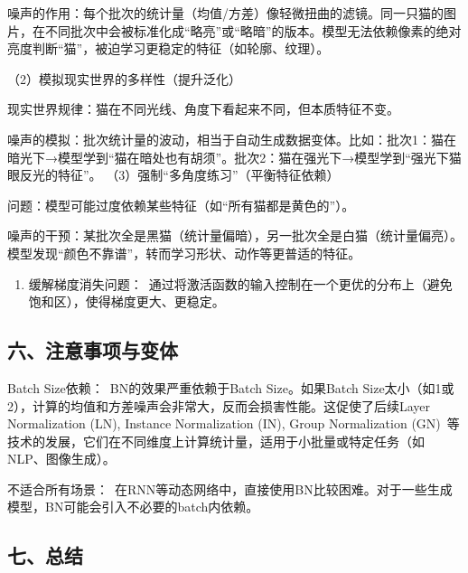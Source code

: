 噪声的作用：每个批次的统计量（均值/方差）像轻微扭曲的滤镜。同一只猫的图片，在不同批次中会被标准化成``略亮''或``略暗''的版本。模型无法依赖像素的绝对亮度判断``猫''，被迫学习更稳定的特征（如轮廓、纹理）。

（2）模拟现实世界的多样性（提升泛化）\hspace{0pt}\hspace{0pt}

现实世界规律：猫在不同光线、角度下看起来不同，但本质特征不变。

噪声的模拟：批次统计量的波动，相当于自动生成数据变体。比如：批次1：猫在暗光下→模型学到``猫在暗处也有胡须''。批次2：猫在强光下→模型学到``强光下猫眼反光的特征''。
（3）强制``多角度练习''（平衡特征依赖）\hspace{0pt}\hspace{0pt}

问题：模型可能过度依赖某些特征（如``所有猫都是黄色的''）。

噪声的干预：某批次全是黑猫（统计量偏暗），另一批次全是白猫（统计量偏亮）。模型发现``颜色不靠谱''，转而学习形状、动作等更普适的特征。

\begin{enumerate}
\def\labelenumi{\arabic{enumi}.}
\setcounter{enumi}{3}
\tightlist
\item
  缓解梯度消失问题：~通过将激活函数的输入控制在一个更优的分布上（避免饱和区），使得梯度更大、更稳定。
\end{enumerate}

\hypertarget{ux516dux6ce8ux610fux4e8bux9879ux4e0eux53d8ux4f53}{%
\subsection{六、注意事项与变体}\label{ux516dux6ce8ux610fux4e8bux9879ux4e0eux53d8ux4f53}}

Batch Size依赖：~BN的效果严重依赖于Batch Size。如果Batch Size太小（如1或2），计算的均值和方差噪声会非常大，反而会损害性能。这促使了后续Layer Normalization (LN), Instance Normalization (IN), Group Normalization (GN)~等技术的发展，它们在不同维度上计算统计量，适用于小批量或特定任务（如NLP、图像生成）。

不适合所有场景：~在RNN等动态网络中，直接使用BN比较困难。对于一些生成模型，BN可能会引入不必要的batch内依赖。

\hypertarget{ux4e03ux603bux7ed3}{%
\subsection{七、总结}\label{ux4e03ux603bux7ed3}}

